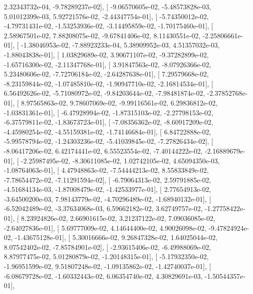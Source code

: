 \documentclass{article}
\begin{document}
          2.32343732e-04,  -9.78289237e-02],
       [ -9.06570605e-02,  -5.48573828e-03,   5.01012399e-03,
          5.92721576e-02,  -2.44347754e-01],
       [ -5.74350012e-02,  -4.79731431e-02,  -1.53253936e-02,
         -3.14495859e-02,  -1.70175460e-01],
       [  2.58967501e-02,   7.88208075e-02,  -9.67841406e-02,
          8.11430551e-02,  -2.25806661e-01],
       [ -1.38046953e-02,  -7.88923233e-04,   5.38909952e-03,
          4.51357032e-03,  -1.88043838e-01],
       [  1.03829689e-02,   3.90671107e-02,  -9.37282899e-02,
         -1.65716300e-02,  -2.11347768e-01],
       [  3.91847563e-02,  -8.07926366e-02,   5.23480606e-02,
         -7.72706184e-02,  -2.64287638e-01],
       [  7.29579668e-02,  -8.23159844e-02,  -1.07485810e-02,
         -1.90947710e-02,  -2.16814534e-01],
       [  6.56492626e-02,  -5.71080972e-02,  -9.84203644e-02,
         -7.98481874e-02,  -2.37852768e-01],
       [  8.97565863e-02,   9.78607069e-02,  -9.99116561e-02,
          6.29836812e-02,  -1.03831361e-01],
       [ -6.47928994e-02,  -1.87315103e-02,  -2.27798153e-02,
         -6.37579811e-02,  -1.83673723e-01],
       [ -7.08356362e-02,  -8.60917209e-02,  -4.45980254e-02,
         -4.55159381e-02,  -1.74146684e-01],
       [  6.84722888e-02,  -5.99578794e-02,  -1.24303236e-02,
         -5.41039845e-02,  -7.27826434e-02],
       [ -8.06417206e-02,   6.42174441e-02,   6.55523554e-02,
         -7.40144222e-02,  -2.16889679e-01],
       [ -2.25987495e-02,  -8.30611085e-02,   1.02742105e-02,
          4.65094350e-03,  -1.08764063e-01],
       [  4.47948863e-02,  -7.54444213e-02,   8.55833849e-02,
         -7.78654472e-02,  -7.11291594e-02],
       [ -6.79064313e-02,   2.59791885e-02,  -4.51684134e-03,
         -1.87008479e-02,  -1.42533977e-01],
       [  2.77654913e-02,  -3.64500200e-03,   7.98143779e-02,
         -4.70296489e-02,  -1.68940132e-01],
       [ -6.52042489e-02,  -3.37634068e-03,   6.59662182e-02,
          3.62749757e-02,  -1.27758422e-01],
       [  8.23924826e-02,   2.66901615e-02,   3.21237122e-02,
          7.09036085e-02,  -2.64027836e-01],
       [  5.69777009e-02,   4.14644400e-02,   4.90026098e-02,
         -9.47824924e-02,  -1.43675128e-01],
       [  5.30016666e-02,   9.26847328e-02,   1.64025044e-02,
          8.07542402e-02,  -7.85784901e-02],
       [ -2.93615406e-02,  -6.49988069e-02,   8.87977475e-02,
          5.01280879e-02,  -1.20148315e-01],
       [ -5.17932350e-02,  -1.96951599e-02,   9.51807248e-02,
         -1.09135862e-02,  -1.42740037e-01],
       [ -6.08679728e-02,  -1.60332443e-02,   6.06354740e-02,
          4.30829691e-03,  -1.50544357e-01],
\end{document}

